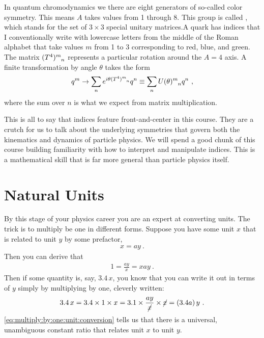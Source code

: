 \documentclass[12pt, oneside]{report}    %
\let\oldsection\section
\def\section{%
  \setcounter{sidenote}{1}%
  \oldsection
}
\begin{document}
\begin{example}
In quantum chromodynamics we there are eight generators of so-called color symmetry. This means $A$ takes values from 1 through 8. This group is called , which stands for the set of $3\times 3$ special unitary matrices.\sidenotemark A quark has indices that I conventionally write with lowercase letters from the middle of the Roman alphabet that take values $m$ from 1 to 3 corresponding to red, blue, and green. The matrix $(T^4)\aij{m}{n}$ represents a particular rotation around the $A=4$ axis. A finite transformation by angle $\theta$ takes the form 
\begin{align}
    q^m \to \sum_n e^{i \theta (T^4)\aij{m}{n} } q^n \equiv \sum_n U(\theta)\aij{m}{n}q^n \ ,
\end{align}
where the sum over $n$ is what we expect from matrix multiplication.
\end{example}

This is all to say that indices feature front-and-center in this course. They are a crutch for us to talk about the underlying symmetries that govern both the kinematics and dynamics of particle physics. We will spend a good chunk of this course building familiarity with how to interpret and manipulate indices. This is a mathematical skill that is far more general than particle physics itself.





\section{Natural Units}
\label{sec:units:dimensions}

By this stage of your physics career you are an expert at converting units. The trick is to multiply be one in different forms. Suppose you have some unit $x$ that is related to unit $y$ by some prefactor,
\begin{align}
    x = a y \ . \label{eq:unit:conversion}
\end{align}
Then you can derive that
\begin{align}
    1 = \frac{ay}{x} = {x}{ay} \ .
    \label{eq:multiply:by:one:unit:conversion}
\end{align}
Then if some quantity is, say, $3.4\,x$, you know that you can write it out in terms of $y$ simply by multiplying by one, cleverly written:
\begin{align}
    3.4\,x = 3.4\times 1 \times x = 3.1 \times \frac{ay}{\cancel{x}} \times \cancel{x}
    = (3.4a)\, y \ .
\end{align}
\eqref{eq:multiply:by:one:unit:conversion} tells us that there is a universal, unambiguous constant ratio that relates unit $x$ to unit $y$. 
\end{document}
